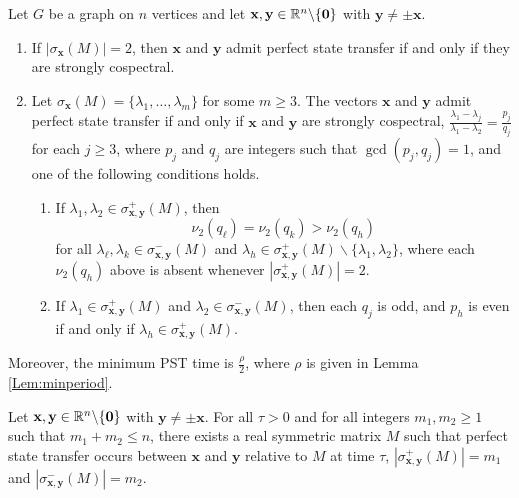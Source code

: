 \documentclass[10pt,a4paper]{amsart}
\def\R{\mathbb{R}}
\newcommand{\bx}{\mathbf x}
\newcommand{\by}{\mathbf y}
\newcommand{\zero}{{\bf{0}}}
\begin{document}
\begin{theorem}
\label{Thm:PSTchar}
Let $G$ be a graph on $n$ vertices and let $\bx,\by \in \R^n\backslash\{\zero\}$ with $\by \ne \pm \bx$.
\begin{enumerate}
\item If $|\sigma_{\bx}(M)|=2$, then $\bx$ and $\by$ admit perfect state transfer if and only if they are strongly cospectral.
\item Let $\sigma_{\bx}(M)=\{\lambda_1,\ldots,\lambda_m\}$ for some $m\geq 3$. The vectors $\bx$ and $\by$ admit perfect state transfer if and only if $\bx$ and $\by$ are strongly cospectral, $\frac{\lambda_1-\lambda_j}{\lambda_1-\lambda_2}=\frac{p_j}{q_j}$ for each $j\geq 3$, where $p_j$ and $q_j$ are integers such that $\operatorname{gcd}(p_j,q_j)=1$, and one of the following conditions holds.
\begin{enumerate}
\item If $\lambda_1,\lambda_2\in\sigma_{\bx,\by}^+(M)$, then $$\nu_2(q_{\ell})=\nu_2(q_{k})>\nu_2(q_h)$$ for all $\lambda_{\ell},\lambda_k\in \sigma_{\bx,\by}^-(M)$ and $\lambda_h\in \sigma_{\bx,\by}^+(M)\backslash\{\lambda_1,\lambda_2\}$, where each $\nu_2(q_h)$ above is absent whenever $|\sigma_{\bx,\by}^+(M)|=2$.
\item If $\lambda_1\in\sigma_{\bx,\by}^+(M)$ and $\lambda_2\in\sigma_{\bx,\by}^-(M)$, then each $q_j$ is odd, and $p_h$ is even if and only if $\lambda_h\in\sigma_{\bx,\by}^+(M)$.
\end{enumerate}
\end{enumerate}
Moreover, the minimum PST time is $\frac{\rho}{2}$, where $\rho$ is given in Lemma \ref{Lem:minperiod}.
\end{theorem}

\begin{theorem}
\label{Thm:prescribedPST}
Let $\bx,\by\in\R^n\backslash\{\zero\}$ with $\by\neq\pm \bx$. For all $\tau>0$ and for all integers $m_1,m_2\geq 1$ such that $m_1+m_2\leq n$, there exists a real symmetric matrix $M$ such that perfect state transfer occurs between $\bx$ and $\by$ relative to $M$ at time $\tau$, $|\sigma_{\bx,\by}^+(M)|=m_1$ and $|\sigma_{\bx,\by}^-(M)|=m_2$.
\end{theorem}
\end{document}
